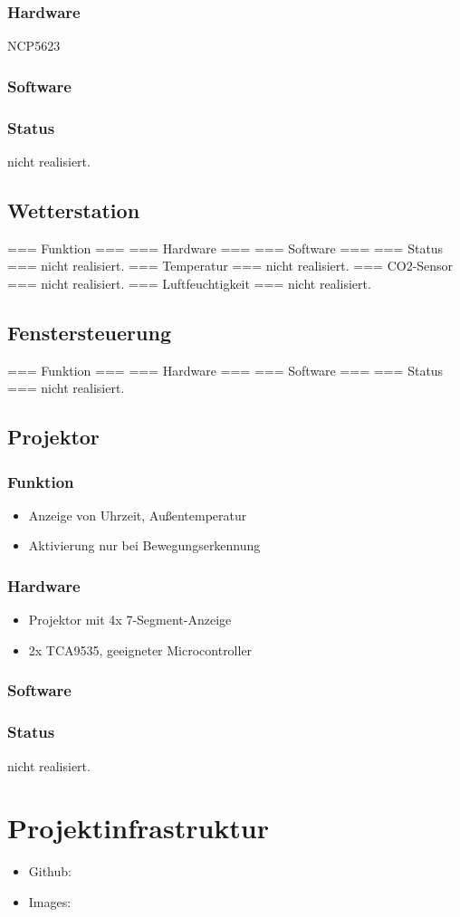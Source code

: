 \documentclass[a4paper,twoside,titlepage,normalheadings,tocleft,bibtotoc]{scrartcl}
\begin{document}
\subsubsection{Hardware}
NCP5623
\subsubsection{Software}
\subsubsection{Status}
nicht realisiert.

\subsection{Wetterstation}
=== Funktion ===
=== Hardware ===
=== Software ===
=== Status ===
nicht realisiert.
=== Temperatur ===
nicht realisiert.
=== CO2-Sensor ===
nicht realisiert.
=== Luftfeuchtigkeit ===
nicht realisiert.
\subsection{Fenstersteuerung}
=== Funktion ===
=== Hardware ===
=== Software ===
=== Status ===
nicht realisiert.

\subsection{Projektor}
\subsubsection{Funktion}
\begin{itemize}
\item Anzeige von Uhrzeit, Außentemperatur
\item Aktivierung nur bei Bewegungserkennung
\end{itemize}

\subsubsection{Hardware}
\begin{itemize}
\item Projektor mit 4x 7-Segment-Anzeige
\item 2x TCA9535, geeigneter Microcontroller
\end{itemize}
\subsubsection{Software}
\subsubsection{Status}
nicht realisiert.

\section{Projektinfrastruktur}
\begin{itemize}
\item Github:  
\item Images:
\end{itemize}
\end{document}
